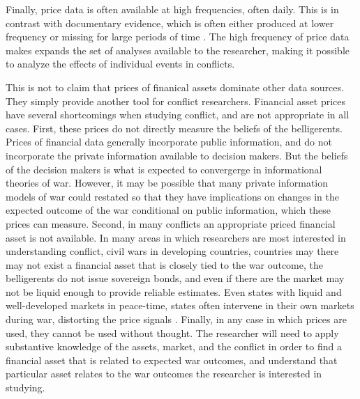 Finally, price data is often available at high frequencies, often daily.
This is in contrast with documentary evidence, which is often either produced at lower frequency or missing for large periods of time \parencite[][57]{Reiter2009}.
The high frequency of price data makes expands the set of analyses available to the researcher, making it possible to analyze the effects of individual events in conflicts.

This is not to claim that prices of finanical assets dominate other data sources.
They simply provide another tool for conflict researchers.
Financial asset prices have several shortcomings when studying conflict, and are not appropriate in all cases.
First, these prices do not directly measure the beliefs of the belligerents.
Prices of financial data generally incorporate public information, and do not incorporate the private information available to decision makers.
But the beliefs of the decision makers is what is expected to convergerge in informational theories of war. 
However, it may be possible that many private information models of war could restated so that they have implications on changes in the expected outcome of the war conditional on public information, which these prices can measure.
Second, in many conflicts an appropriate priced financial asset is not available.
In many areas in which researchers are most interested in understanding conflict, \eg{} civil wars in developing countries, countries may there may not exist a financial asset  that is closely tied to the war outcome, \eg{} the belligerents do not issue sovereign bonds, and even if there are the market may not be liquid enough to provide reliable estimates.
Even states with liquid and well-developed markets in peace-time, states often intervene in their own markets during war, distorting the price signals \parencite[12]{HaberMitchenerOosterlinckEtAl2015}.
Finally, in any case in which prices are used, they cannot be used without thought.
The researcher will need to apply substantive knowledge of the assets, market, and the conflict in order to find a financial asset that is related to expected war outcomes, and understand that particular asset relates to the war outcomes  the researcher is interested in studying.





